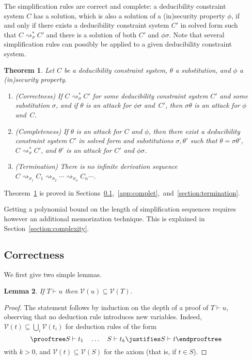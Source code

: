 \documentclass[acmtocl,acmnow]{acmtrans2m}
\newtheorem{theorem}{Theorem}[section]
\newtheorem{lemma}[theorem]{Lemma}
\newcommand{\var}{\mathcal{V}}
\newcommand{\simpl}{\rightsquigarrow}   \newcommand{\msimpl}{\rightsquigarrow}  \newcommand{\gsimpl}{\leadsto}
\newcommand{\dedsys}[1]{deducibility constraint system}
\begin{document}
The simplification rules are correct and complete: a
\dedsys{} $C$ has a solution, which is also a solution of a (in)security property $\phi$, if
and only if there exists a \dedsys{} $C'$ in solved form such that
$C\simpl^*_{\sigma} C'$ and there is a solution of both $C'$ and
$\phi\sigma$.
Note that several simplification rules can possibly be applied to a
given \dedsys{}.
\begin{theorem}\label{theo:general}
Let $C$ be a \dedsys{}, $\theta$ a substitution, and $\phi$ a (in)security property.
\begin{enumerate}
\item(Correctness) If $C\simpl^*_{\sigma} C'$ for some
  \dedsys{} $C'$
  and some substitution $\sigma$, and  if $\theta$ is an attack for 
$\phi\sigma$ and~$C'$, then $\sigma\theta$ is an attack for $\phi$ and~$C$.
\item(Completeness) If $\theta$ is an attack for $C$  and $\phi$, 
then there exist a \dedsys{} $C'$ in solved form
  and  substitutions $\sigma,\theta'$ such that $\theta
  =\sigma\theta'$, $C\simpl^*_{\sigma} C'$, and $\theta'$ is 
an attack for $C'$ and $\phi\sigma$. \item(Termination)  There is no infinite derivation sequence
$C \simpl_{\sigma_1}\! C_1\! \simpl_{\sigma_2}\! \cdots\! \simpl_{\sigma_n}\! C_n \cdots$.
\end{enumerate}
\end{theorem}





Theorem~\ref{theo:general} is
proved in Sections~\ref{app:corect},~\ref{app:complet},~and~\ref{section:termination}.

Getting a polynomial bound on the length of simplification sequences
requires however an additional memorization technique.
This is explained in Section~\ref{section:complexity}.










\subsection{Correctness}\label{app:corect}

We first give two simple lemmas.
\begin{lemma}\label{lemma_deduc-var}
If $T\vdash u$ then $\var(u)\subseteq\var(T)$.
\end{lemma}
\begin{proof}
The statement follows by induction on the depth of a proof of $T\vdash u$,
observing that no deduction rule introduces new variables. Indeed,
$\var(t)\subseteq\bigcup_i\var(t_i)$ for deduction rules of the form
\[
\prooftree
S\vdash t_1 \quad \dots \quad S\vdash t_k
\justifies
S\vdash t
\endprooftree
\]
with $k>0$, and $\var(t)\subseteq\var(S)$ for the axiom (that is, if $t\in S$).
\end{proof}
\end{document}
